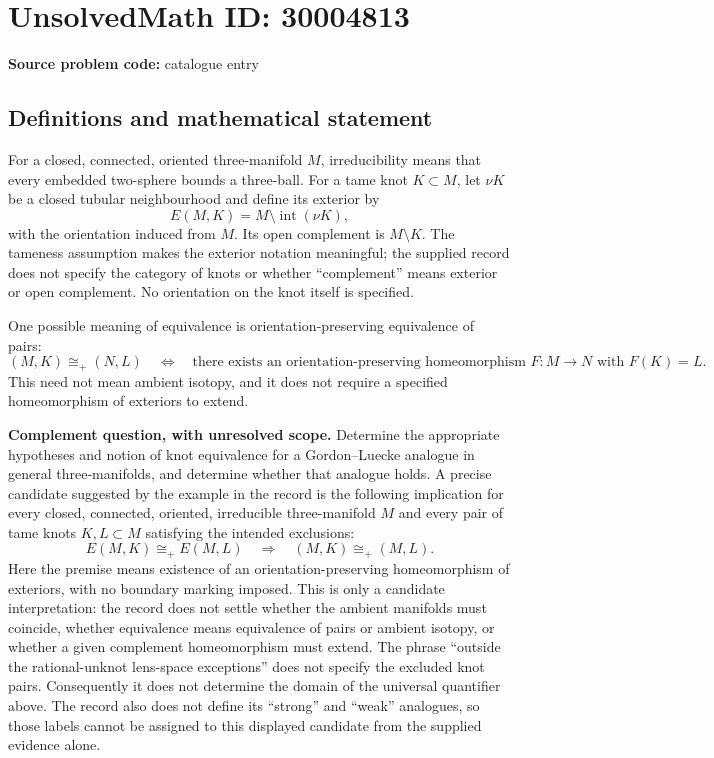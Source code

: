 \documentclass[11pt]{article}
\begin{document}
\section*{UnsolvedMath ID: 30004813}
\textbf{Source problem code:} catalogue entry
\subsection{Definitions and mathematical statement}
For a closed, connected, oriented three-manifold \(M\), irreducibility means that every embedded two-sphere bounds a three-ball. For a tame knot \(K\subset M\), let \(\nu K\) be a closed tubular neighbourhood and define its exterior by
\[
E(M,K)=M\setminus\operatorname{int}(\nu K),
\]
with the orientation induced from \(M\). Its open complement is \(M\setminus K\). The tameness assumption makes the exterior notation meaningful; the supplied record does not specify the category of knots or whether ``complement'' means exterior or open complement. No orientation on the knot itself is specified.

One possible meaning of equivalence is orientation-preserving equivalence of pairs:
\[
(M,K)\cong_{+}(N,L)
\quad\Longleftrightarrow\quad
\text{there exists an orientation-preserving homeomorphism }F:M\longrightarrow N
\text{ with }F(K)=L.
\]
This need not mean ambient isotopy, and it does not require a specified homeomorphism of exteriors to extend.

\textbf{Complement question, with unresolved scope.}
Determine the appropriate hypotheses and notion of knot equivalence for a Gordon--Luecke analogue in general three-manifolds, and determine whether that analogue holds. A precise candidate suggested by the example in the record is the following implication for every closed, connected, oriented, irreducible three-manifold \(M\) and every pair of tame knots \(K,L\subset M\) satisfying the intended exclusions:
\[
E(M,K)\cong_{+}E(M,L)
\quad\Longrightarrow\quad
(M,K)\cong_{+}(M,L).
\]
Here the premise means existence of an orientation-preserving homeomorphism of exteriors, with no boundary marking imposed. This is only a candidate interpretation: the record does not settle whether the ambient manifolds must coincide, whether equivalence means equivalence of pairs or ambient isotopy, or whether a given complement homeomorphism must extend. The phrase ``outside the rational-unknot lens-space exceptions'' does not specify the excluded knot pairs. Consequently it does not determine the domain of the universal quantifier above. The record also does not define its ``strong'' and ``weak'' analogues, so those labels cannot be assigned to this displayed candidate from the supplied evidence alone.
\end{document}
